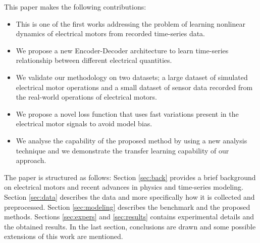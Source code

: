 \documentclass[letterpaper]{article}
\begin{document}
This paper makes the following contributions:
\begin{itemize}
    \item This is one of the first works addressing the problem of learning nonlinear dynamics of electrical motors from recorded time-series data.
    \item We propose a new Encoder-Decoder architecture to learn time-series relationship between different electrical quantities.
    \item We validate our methodology on two datasets; a large dataset of simulated electrical motor operations and a small dataset of sensor data recorded from the real-world operations of electrical motors.
    \item We propose a novel loss function that uses fast variations present in the electrical motor signals to avoid model bias.
    \item We analyse the capability of the proposed method by using a new analysis technique and we demonstrate the transfer learning capability of our approach.
\end{itemize}

The paper is structured as follows: Section \ref{sec:back} provides a brief background on electrical motors and recent advances in physics and time-series modeling. Section \ref{sec:data} describes the data and more specifically how it is collected and preprocessed. Section \ref{sec:modeling} describes the benchmark and the proposed methods. Sections \ref{sec:expers} and \ref{sec:results} contains experimental details and the obtained results. In the last section, conclusions are drawn and some possible extensions of this work are mentioned.
\end{document}
